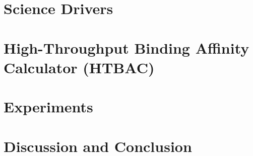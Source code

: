 \documentclass[conference]{IEEEtran}
\begin{document}
\section{Science Drivers}\label{sec:science-drivers}




\section{High-Throughput Binding Affinity Calculator
(HTBAC)}\label{sec:htbac}



% 


\section{Experiments}\label{sec:experiments}



\section{Discussion and Conclusion}\label{sec:discussion}


\newpage



\end{document}
